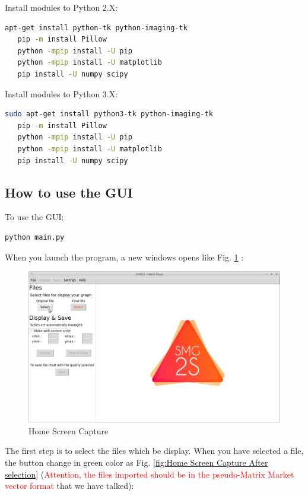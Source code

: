 \documentclass[a4paper, 10 pt]{report}
\begin{document}
	Install modules to Python 2.X:
	\begin{lstlisting}[language=bash,frame=single]
   apt-get install python-tk python-imaging-tk
   pip -m install Pillow
   python -mpip install -U pip
   python -mpip install -U matplotlib
   pip install -U numpy scipy
	\end{lstlisting}

	Install modules to Python 3.X:
	\begin{lstlisting}[language=bash,frame=single]
   sudo apt-get install python3-tk python-imaging-tk
   pip -m install Pillow
   python -mpip install -U pip
   python -mpip install -U matplotlib
   pip install -U numpy scipy
	\end{lstlisting}

	\subsection{How to use the GUI}
	
	To use the GUI:
	\begin{lstlisting}[language=bash,frame=single]
   python main.py
    \end{lstlisting}

When you launch the program, a new windows opens like Fig. \ref{fig:Home Screen Capture} :

	\begin{figure}[htbp]
		\label{fig:Home Screen Capture}
		\caption{Home Screen Capture}
		\centering
		\includegraphics[width=12cm]{home.png}
	\end{figure}

The first step is to select the files which be display. When you have selected a file, the button change in green color as Fig. \ref{fig:Home Screen Capture After selection} (\textcolor{red}{Attention, the files imported should be in the pseudo-Matrix Market vector format} that we have talked):
\end{document}
